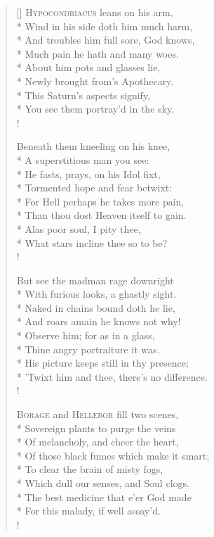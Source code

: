 \begin{verse}[\versewidth]
\textsc{Hypocondriacus} leans on his arm,\\*
Wind in his side doth him much harm,\\*
And troubles him full sore, God knows,\\*
Much pain he hath and many woes.\\*
About him pots and glasses lie,\\*
Newly brought from's Apothecary.\\*
This Saturn's aspects signify,\\*
You see them portray'd in the sky.\\!

Beneath them kneeling on his knee,\\*
A superstitious man you see:\\*
He fasts, prays, on his Idol fixt,\\*
Tormented hope and fear betwixt:\\*
For Hell perhaps he takes more pain,\\*
Than thou dost Heaven itself to gain.\\*
Alas poor soul, I pity thee,\\*
What stars incline thee so to be?\\!

But see the madman rage downright\\*
With furious looks, a ghastly sight.\\*
Naked in chains bound doth he lie,\\*
And roars amain he knows not why!\\*
Observe him; for as in a glass,\\*
Thine angry portraiture it was.\\*
His picture keeps still in thy presence;\\*
'Twixt him and thee, there's no difference.\\!

\textsc{Borage} and \textsc{Hellebor} fill two scenes,\\*
Sovereign plants to purge the veins\\*
Of melancholy, and cheer the heart,\\*
Of those black fumes which make it smart;\\*
To clear the brain of misty fogs,\\*
Which dull our senses, and Soul clogs.\\*
The best medicine that e'er God made\\*
For this malady, if well assay'd.\\!


\end{verse}
